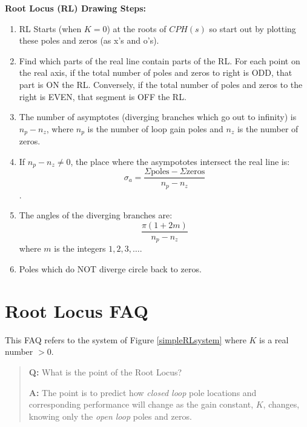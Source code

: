 {\bf Root Locus (RL) Drawing Steps:}	%
\begin{enumerate}
  \item RL Starts (when $K=0$) at the roots of $CPH(s)$ so start out by  plotting these poles and zeros (as x's and o's).
  \item Find which parts of the real line contain parts of the RL.  For each point on the real axis, if the total number of poles and zeros to right is ODD, that part is ON the RL. Conversely, if the total number of poles and zeros to the right is EVEN, that segment is OFF the RL.
  \item The number of asymptotes (diverging branches which go out to infinity)  is $n_p-n_z$, where $n_p$ is the number of loop gain poles and $n_z$ is the number of zeros.
  \item If $n_p-n_z \neq 0$, the place where the asympototes intersect the real line is:
 $$
 \sigma_a = \frac{\Sigma\mathrm{poles}- \Sigma\mathrm{zeros}}{n_p-n_z}
 $$.

 \item The angles of the diverging branches are:
 $$
 \frac{\pi(1+2m)}{n_p-n_z}
 $$
 where $m$ is the integers $1, 2 , 3, \dots$.
  \item Poles which do NOT diverge circle back to zeros.
\end{enumerate}







\section{Root Locus FAQ}

This FAQ refers to the system of Figure \ref{simpleRLsystem} where $K$ is a real
number $>0$.

\vspace{0.25in}
\begin{quotation}
{\bf Q:}  What is the point of the Root Locus?

{\bf A:}  The point is to predict how {\it closed loop} pole
locations  and  corresponding performance will change as the gain constant, $K$, changes,
knowing only the {\it open loop} poles and zeros.
\end{quotation}

\vspace{0.35in}	%

